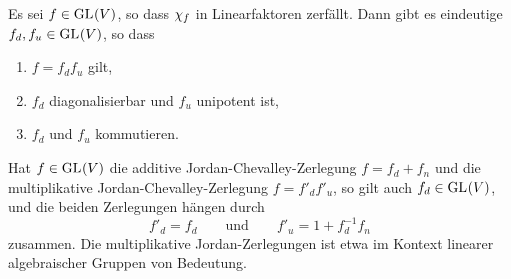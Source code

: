 \begin{theorem}
  Es sei $f \in \operatorname{GL}_{}(V)$, so dass $\chi_{f}$ in Linearfaktoren zerfällt.
  Dann gibt es eindeutige $f_d, f_u \in \operatorname{GL}_{}(V)$, so dass
  \begin{enumerate}
    \item
      $f = f_d f_u$ gilt,
    \item
      $f_d$ diagonalisierbar und $f_u$ unipotent ist,
    \item
      $f_d$ und $f_u$ kommutieren.
  \end{enumerate}
\end{theorem}

Hat $f \in \operatorname{GL}_{}(V)$ die additive Jordan-Chevalley-Zerlegung $f = f_d + f_n$ und die multiplikative Jordan-Chevalley-Zerlegung $f = f'_d f'_u$, so gilt auch $f_d \in \operatorname{GL}_{}(V)$, und die beiden Zerlegungen hängen durch
\[
  f'_d = f_d
  \qquad\text{und}\qquad
  f'_u = 1 + f_d^{-1} f_n
\]
zusammen.
Die multiplikative Jordan-Zerlegungen ist etwa im Kontext linearer algebraischer Gruppen von Bedeutung.

